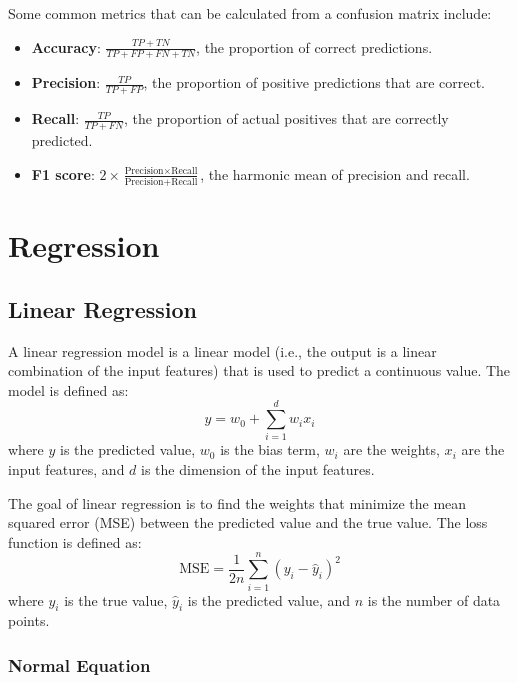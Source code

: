 \documentclass[a4paper,12pt]{article}
\begin{document}
Some common metrics that can be calculated from a confusion matrix include:
\begin{itemize}
  \item \textbf{Accuracy}: $\frac{TP + TN}{TP + FP + FN + TN}$, the proportion of correct predictions.
  \item \textbf{Precision}: $\frac{TP}{TP + FP}$, the proportion of positive predictions that are correct.
  \item \textbf{Recall}: $\frac{TP}{TP + FN}$, the proportion of actual positives that are correctly predicted.
  \item \textbf{F1 score}: $2 \times \frac{\text{Precision} \times \text{Recall}}{\text{Precision} + \text{Recall}}$, the harmonic mean of precision and recall.
\end{itemize}

\section{Regression}

\subsection{Linear Regression}

A linear regression model is a linear model (i.e., the output is a linear combination of the input features) that is used to predict a continuous value. The model is defined as:
\begin{equation*}
  y = w_0 + \sum_{i=1}^{d} w_i x_i
\end{equation*}
where $y$ is the predicted value, $w_0$ is the bias term, $w_i$ are the weights, $x_i$ are the input features, and $d$ is the dimension of the input features.

The goal of linear regression is to find the weights that minimize the mean squared error (MSE) between the predicted value and the true value. The loss function is defined as:
\begin{equation*}
  \text{MSE} = \frac{1}{2n} \sum_{i=1}^{n} (y_i - \hat{y}_i)^2
\end{equation*}
where $y_i$ is the true value, $\hat{y}_i$ is the predicted value, and $n$ is the number of data points.

\subsubsection{Normal Equation}
\end{document}

